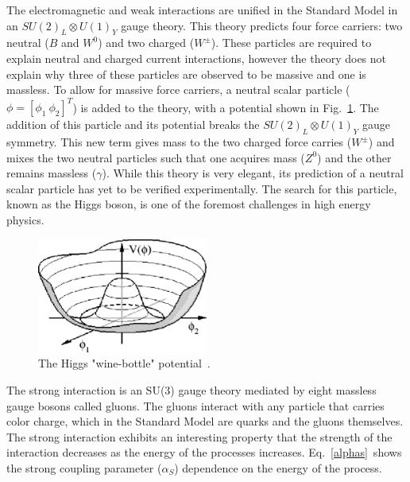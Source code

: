 The electromagnetic and weak interactions are unified in the Standard Model in an $SU(2)_{L} \otimes U(1)_{Y}$ gauge theory. This theory predicts four force carriers: two neutral ($B$ and $W^{0}$) and two charged  ($W^{\pm}$). These particles are required to explain neutral and charged current interactions, however the theory does not explain why three of these particles are observed to be massive and one is massless. To allow for massive force carriers, a neutral scalar particle ($\phi=[\phi_{1}~\phi_{2}]^{T}$) is added to the theory, with a potential shown in Fig.~\ref{HiggsPotential}. The addition of this particle and its potential breaks the $SU(2)_{L} \otimes U(1)_{Y}$ gauge symmetry. This new term gives mass to the two charged force carries ($W^{\pm}$) and mixes the two neutral particles such that one acquires mass ($Z^{0}$) and the other remains massless ($\gamma$). While this theory is very elegant, its prediction of a neutral scalar particle has yet to be verified experimentally. The search for this particle, known as the Higgs boson, is one of the foremost challenges in high energy physics.

\begin{figure}[!h!tbp]
\begin{center}
\includegraphics[width=0.50\textwidth]{eps/Theory/HiggsPotential.eps}
\end{center}
\vspace{-0.1in}
\caption{The Higgs "wine-bottle" potential~\cite{higgspotential}.}
\label{HiggsPotential}
\end{figure}

The strong interaction is an SU(3) gauge theory mediated by eight massless gauge bosons called gluons. The gluons interact with any particle that carries color charge, which in the Standard Model are quarks and the gluons themselves. The strong interaction exhibits an interesting property that the strength of the interaction decreases as the energy of the processes increases. Eq.~\ref{alphas}~shows the strong coupling parameter ($\alpha_{S}$) dependence on the energy of the process. 

